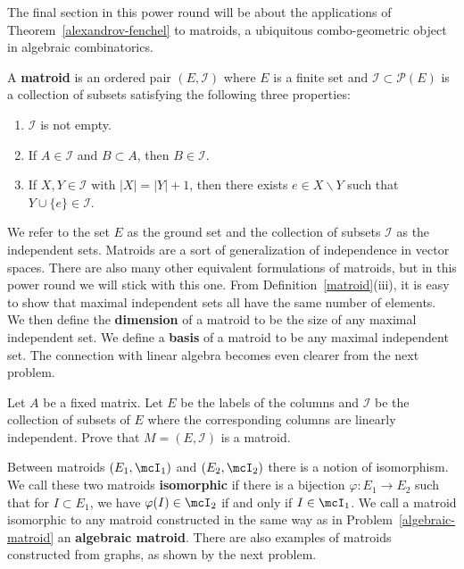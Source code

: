 \documentclass[11pt]{article}
\begin{document}
The final section in this power round will be about the applications of Theorem~\ref{alexandrov-fenchel} to matroids, a ubiquitous combo-geometric object in algebraic combinatorics.  

\begin{defn} \label{matroid}
    A \textbf{matroid} is an ordered pair $(E, \mathcal{I})$ where $E$ is a finite set and $\mathcal{I} \subset \mathcal{P}(E)$ is a collection of subsets satisfying the following three properties:
    \begin{enumerate}[label = (\roman*)]
        \item $\mathcal{I}$ is not empty. 
        \item If $A \in \mathcal{I}$ and $B \subset A$, then $B \in \mathcal{I}$.
        \item If $X, Y \in \mathcal{I}$ with $|X| = |Y| + 1$, then there exists $e \in X \backslash Y$ such that $Y \cup \{e\} \in \mathcal{I}$. 
    \end{enumerate}
\end{defn}

We refer to the set $E$ as the ground set and the collection of subsets $\mathcal{I}$ as the independent sets. Matroids are a sort of generalization of independence in vector spaces. There are also many other equivalent formulations of matroids, but in this power round we will stick with this one. From Definition~\ref{matroid}(iii), it is easy to show that maximal independent sets all have the same number of elements. We then define the \textbf{dimension} of a matroid to be the size of any maximal independent set. We define a \textbf{basis} of a matroid to be any maximal independent set. The connection with linear algebra becomes even clearer from the next problem. 

\begin{prob} \label{algebraic-matroid}
    Let $A$ be a fixed matrix. Let $E$ be the labels of the columns and $\mathcal{I}$ be the collection of subsets of $E$ where the corresponding columns are linearly independent. Prove that $M = (E, \mathcal{I})$ is a matroid. 
\end{prob}

Between matroids $(E_1, \mcI_1)$ and $(E_2, \mcI_2)$ there is a notion of isomorphism. We call these two matroids \textbf{isomorphic} if there is a bijection $\varphi : E_1 \to E_2$ such that for $I \subset E_1$, we have $\varphi(I) \in \mcI_2$ if and only if $I \in \mcI_1$. We call a matroid isomorphic to any matroid constructed in the same way as in Problem~\ref{algebraic-matroid} an \textbf{algebraic matroid}. There are also examples of matroids constructed from graphs, as shown by the next problem. 
\end{document}
